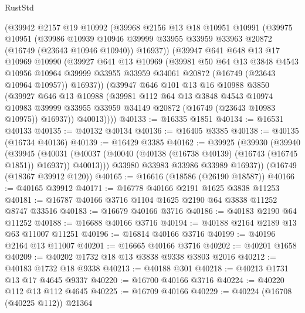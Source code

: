 \begin{lexlean}{RustStd}
\begin{coremodule}
    (@39942
      @2157
      @19
      @10992
      (@39968
        @2156
        @13
        @18
        @10951
        @10991
        (@39975
          @10951
          (@39986
            @10939
            @10946
            @39999
            @33955
            @33959
            @33963
            @20872
            (@16749 (@23643 @10946 @10940))
            @16937))
        (@39947
          @641
          @648
          @13
          @17
          @10969
          @10990
          (@39927
            @641
            @13
            @10969
            (@39981
              @50
              @64
              @13
              @3848
              @4543
              @10956
              @10964
              @39999
              @33955
              @33959
              @34061
              @20872
              (@16749 (@23643 @10964 @10957))
              @16937))
          (@39947
            @646
            @101
            @13
            @16
            @10988
            @3850
            (@39927
              @646
              @13
              @10988
              (@39981
                @112
                @64
                @13
                @3848
                @4543
                @10974
                @10983
                @39999
                @33955
                @33959
                @34149
                @20872
                (@16749 (@23643 @10983 @10975))
                @16937))
            @40013))))
@40133 := @16335 @1851
@40134 := @16531 @40133
@40135 := @40132 @40134
@40136 := @16405 @3385
@40138 := @40135 (@16734 @40136)
@40139 := @16429 @3385
@40162 := @39925
    (@39930
      (@39940
        (@39945
          (@40031 (@40037 (@40040 (@40138 (@16738 @40139) (@16743 (@16745 @1851)) @16937)) @40013)))
        @33980
        @33983
        @33986
        @33989
        @16937))
    (@16749 (@18367 @39912 @120))
@40165 := @16616 (@18586 (@26190 @18587))
@40166 := @40165 @39912
@40171 := @16778 @40166 @2191 @1625 @3838 @11253
@40181 := @16787 @40166 @3716 @1104 @1625 @2190 @64 @3838 @11252 @8747 @33516
@40183 := @16679 @40166 @3716
@40186 := @40183 @2190 @64 @11252
@40188 := @16688 @40166 @3716
@40194 := @40188 @2164 @2189 @13 @63 @11007 @11251
@40196 := @16814 @40166 @3716
@40199 := @40196 @2164 @13 @11007
@40201 := @16665 @40166 @3716
@40202 := @40201 @1658
@40209 := @40202 @1732 @18 @13 @3838 @9338 @3803 @2016
@40212 := @40183 @1732 @18 @9338
@40213 := @40188 @301
@40218 := @40213 @1731 @13 @17 @4645 @9337
@40220 := @16700 @40166 @3716
@40224 := @40220 @112 @13 @112 @4645
@40225 := @16709 @40166
@40229 := @40224 (@16708 (@40225 @112)) @21364

\end{coremodule}
\end{lexlean}
